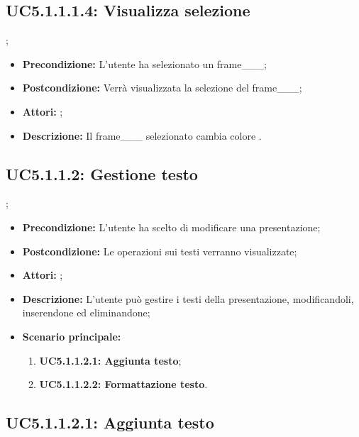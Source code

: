 \subsection{ UC5.1.1.1.4: Visualizza selezione}
;
\begin{itemize}
	\item \textbf{Precondizione:} L'utente ha selezionato un frame___;
	\item \textbf{Postcondizione:} Verrà visualizzata la selezione del frame___;
	\item \textbf{Attori:} ;
	\item \textbf{Descrizione:} Il frame___ selezionato cambia colore .
\end{itemize}
\subsection{ UC5.1.1.2: Gestione testo}
;
\begin{itemize}
	\item \textbf{Precondizione:} L'utente ha scelto di modificare una presentazione;
	\item \textbf{Postcondizione:} Le operazioni sui testi verranno visualizzate;
	\item \textbf{Attori:} ;
	\item \textbf{Descrizione:} L'utente può gestire i testi della presentazione, modificandoli, inserendone ed eliminandone;
	\item \textbf{Scenario principale:}
	\begin{enumerate}
		\item \textbf{ UC5.1.1.2.1: Aggiunta testo};
		\item \textbf{ UC5.1.1.2.2: Formattazione testo}.
	\end{enumerate}
\end{itemize}
\subsection{ UC5.1.1.2.1: Aggiunta testo}

